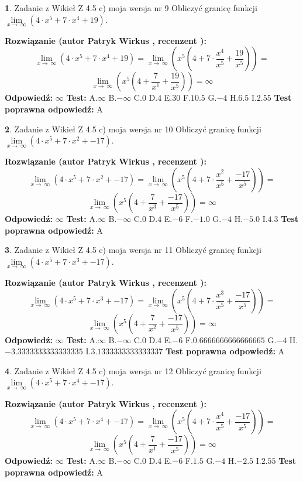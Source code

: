 \documentclass[12pt, a4paper]{article}
\theoremstyle{definition} %
\newtheorem{zad}{}
\newcommand{\zadStart}[1]{\begin{zad}#1\newline}
\newcommand{\zadStop}{\end{zad}}
\newcommand{\rozwStart}[2]{\noindent \textbf{Rozwiązanie (autor #1 , recenzent #2): }\newline}
\newcommand{\rozwStop}{\newline}
\newcommand{\odpStart}{\noindent \textbf{Odpowiedź:}\newline}
\newcommand{\odpStop}{\newline}
\newcommand{\testStart}{\noindent \textbf{Test:}\newline}
\newcommand{\testStop}{\newline}
\newcommand{\kluczStart}{\noindent \textbf{Test poprawna odpowiedź:}\newline}
\newcommand{\kluczStop}{\newline}
\begin{document}
\zadStart{Zadanie z Wikieł Z 4.5 c) moja wersja nr 9}
Obliczyć granicę funkcji  $\lim\limits_{x\to\ \infty}(4 \cdot x^{5}+7 \cdot x^{4}+19)$.
\zadStop
\rozwStart{Patryk Wirkus}{}
$$\lim\limits_{x\to\ \infty}(4 \cdot x^{5}+7 \cdot x^{4}+19) = \lim\limits_{x\to\ \infty}(x^{5}(4 +7 \cdot \frac{x^{4}}{x^{5}}+\frac{19}{x^{5}})) =$$ $$\lim\limits_{x\to\ \infty}(x^{5}(4 +\frac{7}{x^{1}}+\frac{19}{x^{5}})) =\infty$$
\rozwStop
\odpStart
$\infty$
\odpStop
\testStart
A.$\infty$ B.$-\infty$ C.$0$ D.$4$ E.$30$
F.$10.5$ G.$-4$
H.$6.5$
I.$2.55$
\testStop
\kluczStart
A
\kluczStop



\zadStart{Zadanie z Wikieł Z 4.5 c) moja wersja nr 10}
Obliczyć granicę funkcji  $\lim\limits_{x\to\ \infty}(4 \cdot x^{5}+7 \cdot x^{2}+-17)$.
\zadStop
\rozwStart{Patryk Wirkus}{}
$$\lim\limits_{x\to\ \infty}(4 \cdot x^{5}+7 \cdot x^{2}+-17) = \lim\limits_{x\to\ \infty}(x^{5}(4 +7 \cdot \frac{x^{2}}{x^{5}}+\frac{-17}{x^{5}})) =$$ $$\lim\limits_{x\to\ \infty}(x^{5}(4 +\frac{7}{x^{3}}+\frac{-17}{x^{5}})) =\infty$$
\rozwStop
\odpStart
$\infty$
\odpStop
\testStart
A.$\infty$ B.$-\infty$ C.$0$ D.$4$ E.$-6$
F.$-1.0$ G.$-4$
H.$-5.0$
I.$4.3$
\testStop
\kluczStart
A
\kluczStop



\zadStart{Zadanie z Wikieł Z 4.5 c) moja wersja nr 11}
Obliczyć granicę funkcji  $\lim\limits_{x\to\ \infty}(4 \cdot x^{5}+7 \cdot x^{3}+-17)$.
\zadStop
\rozwStart{Patryk Wirkus}{}
$$\lim\limits_{x\to\ \infty}(4 \cdot x^{5}+7 \cdot x^{3}+-17) = \lim\limits_{x\to\ \infty}(x^{5}(4 +7 \cdot \frac{x^{3}}{x^{5}}+\frac{-17}{x^{5}})) =$$ $$\lim\limits_{x\to\ \infty}(x^{5}(4 +\frac{7}{x^{2}}+\frac{-17}{x^{5}})) =\infty$$
\rozwStop
\odpStart
$\infty$
\odpStop
\testStart
A.$\infty$ B.$-\infty$ C.$0$ D.$4$ E.$-6$
F.$0.6666666666666665$ G.$-4$
H.$-3.3333333333333335$
I.$3.1333333333333337$
\testStop
\kluczStart
A
\kluczStop



\zadStart{Zadanie z Wikieł Z 4.5 c) moja wersja nr 12}
Obliczyć granicę funkcji  $\lim\limits_{x\to\ \infty}(4 \cdot x^{5}+7 \cdot x^{4}+-17)$.
\zadStop
\rozwStart{Patryk Wirkus}{}
$$\lim\limits_{x\to\ \infty}(4 \cdot x^{5}+7 \cdot x^{4}+-17) = \lim\limits_{x\to\ \infty}(x^{5}(4 +7 \cdot \frac{x^{4}}{x^{5}}+\frac{-17}{x^{5}})) =$$ $$\lim\limits_{x\to\ \infty}(x^{5}(4 +\frac{7}{x^{1}}+\frac{-17}{x^{5}})) =\infty$$
\rozwStop
\odpStart
$\infty$
\odpStop
\testStart
A.$\infty$ B.$-\infty$ C.$0$ D.$4$ E.$-6$
F.$1.5$ G.$-4$
H.$-2.5$
I.$2.55$
\testStop
\kluczStart
A
\kluczStop
\end{document}
